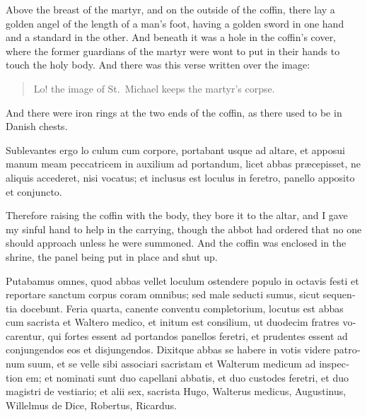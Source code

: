\documentclass{book}
\begin{document}
\begin{paracol}{2}
Above the breast of the martyr, and on the outside of the coffin, there lay a golden angel of the length of a man's foot, having a golden sword in one hand and a standard in the other. And beneath it was a hole in the coffin's cover, where the former guardians of the martyr were wont to put in their hands to touch the holy body. And there was this verse written over the image:
\begin{verse}
Lo! the image of St.\ Michael keeps the martyr's corpse.
\end{verse}
And there were iron rings at the two ends of the coffin, as there used to be in Danish chests.

\switchcolumn*

\begin{otherlanguage}{latin}
Sublevantes ergo lo culum cum corpore, portabant usque ad altare, et apposui manum meam peccatricem in auxilium ad portandum, licet abbas pr\ae{}cepisset, ne aliquis accederet, nisi vocatus; et inclusus est loculus in feretro, panello apposito et conjuncto.
\end{otherlanguage}

\switchcolumn

Therefore raising the coffin with the body, they bore it to the altar, and I gave my sinful hand to help in the carrying, though the abbot had ordered that no one should approach unless he were summoned. And the coffin was enclosed in the shrine, the panel being put in place and shut up.

\switchcolumn*

\begin{otherlanguage}{latin}
Putabamus omnes, quod abbas vellet loculum ostendere populo in octavis festi et reportare sanctum corpus coram omnibus; sed male seducti sumus, sicut sequentia docebunt. Feria quarta, canente conventu completorium, locutus est abbas cum sacrista et Waltero medico, et initum est consilium, ut duodecim fratres vocarentur, qui fortes essent ad portandos panellos feretri, et prudentes essent ad conjungendos eos et disjungendos. Dixitque abbas se habere in votis videre patronum suum, et se velle sibi associari sacristam et Walterum medicum ad inspection em; et nominati sunt duo capellani abbatis, et duo custodes feretri, et duo magistri de vestiario; et alii sex, sacrista Hugo, Walterus medicus, Augustinus, Willelmus de Dice, Robertus, Ricardus.
\end{otherlanguage}

\switchcolumn


\end{paracol}
\end{document}
